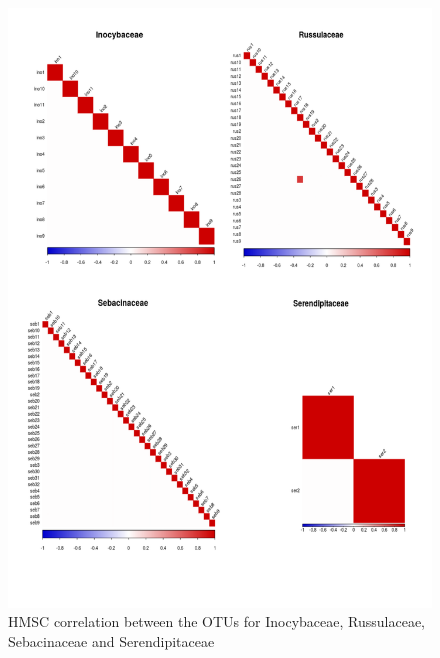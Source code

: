\begin{figure}[htbp]
\centering
\includegraphics[keepaspectratio,width=\textwidth,height=0.75\textheight]{images/hmscfam01.png}
\caption{HMSC correlation between the OTUs for Inocybaceae, Russulaceae, Sebacinaceae and Serendipitaceae}
\end{figure}

